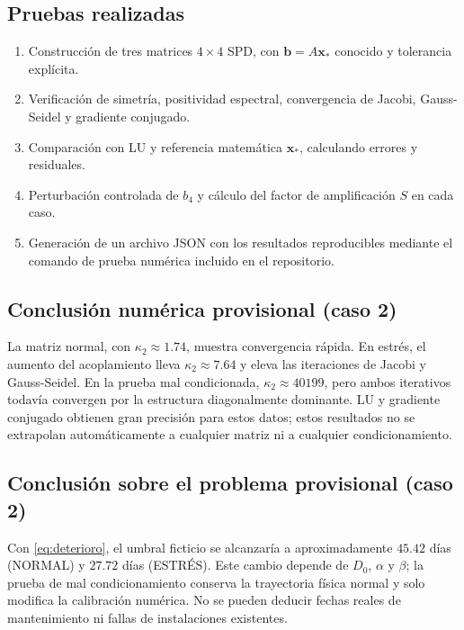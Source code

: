 \documentclass[letterpaper,11pt]{article}
\begin{document}
\subsection{Pruebas realizadas}
\begin{enumerate}
\item Construcción de tres matrices $4\times4$ SPD, con $\boldsymbol{b}=A\boldsymbol{x}_*$ conocido y tolerancia explícita.
\item Verificación de simetría, positividad espectral, convergencia de Jacobi, Gauss-Seidel y gradiente conjugado.
\item Comparación con LU y referencia matemática $\boldsymbol{x}_*$, calculando errores y residuales.
\item Perturbación controlada de $b_4$ y cálculo del factor de amplificación $S$ en cada caso.
\item Generación de un archivo JSON con los resultados reproducibles mediante el comando de prueba numérica incluido en el repositorio.
\end{enumerate}
\subsection{Conclusión numérica provisional (caso 2)}
La matriz normal, con $\kappa_2\approx1.74$, muestra convergencia rápida. En estrés, el aumento del acoplamiento lleva $\kappa_2\approx7.64$ y eleva las iteraciones de Jacobi y Gauss-Seidel. En la prueba mal condicionada, $\kappa_2\approx40199$, pero ambos iterativos todavía convergen por la estructura diagonalmente dominante. LU y gradiente conjugado obtienen gran precisión para estos datos; estos resultados no se extrapolan automáticamente a cualquier matriz ni a cualquier condicionamiento.
\subsection{Conclusión sobre el problema provisional (caso 2)}
Con \eqref{eq:deterioro}, el umbral ficticio se alcanzaría a aproximadamente $45.42$ días (NORMAL) y $27.72$ días (ESTRÉS). Este cambio depende de $D_0$, $\alpha$ y $\beta$; la prueba de mal condicionamiento conserva la trayectoria física normal y solo modifica la calibración numérica. No se pueden deducir fechas reales de mantenimiento ni fallas de instalaciones existentes.
\end{document}
